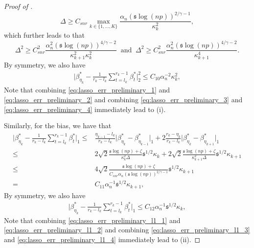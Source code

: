\documentclass[11pt]{article}
\newcommand{\s}{ { \mathfrak{s}  } }
\theoremstyle{plain}
\theoremstyle{definition}
\begin{document}
\begin{proof}[Proof of ]
$$\Delta \ge C_{snr} \max_{k \in \{1, \dots, K\}}\frac{\alpha_n(\s\log( np))^{2/\gamma -1}}{\kappa_k^2},$$
which further leads to that
$$\Delta^2 \ge C_{snr}^2\frac{\alpha_n^2(\s\log( np))^{4/\gamma -2}}{\kappa_{k+1}^2\kappa_{k}^2} \;\; \text{and} \;\; \Delta^2 \ge C_{snr}^2\frac{\alpha_n^2(\s\log( np))^{4/\gamma -2}}{\kappa_{k+1}^4}.$$
By symmetry, we also have 
\begin{align}\label{eq:lasso_err_preliminary_4}
    \bigg|\beta_{\eta_k}^* - \frac{1}{r_k-l_k}\sum_{t = l_k}^{r_k-1}\beta_t^*\bigg|_2^2 
    \leq C_{10}\alpha_n^{-2}\kappa_{k}^2,
\end{align}
Note that combining \eqref{eq:lasso_err_preliminary_1} and \eqref{eq:lasso_err_preliminary_2} and combining \eqref{eq:lasso_err_preliminary_3} and \eqref{eq:lasso_err_preliminary_4} immediately lead to (i).

Similarly, for the bias, we have that
\begin{align}\label{eq:lasso_err_preliminary_l1_2}
    \bigg|\beta_{\eta_k}^* - \frac{1}{r_k-l_k}\sum_{t = l_k}^{r_k-1}\beta_t^*\bigg|_1 
    \leq& \frac{\eta_{k-1}-l_k}{r_k-l_k}\big|\beta_{\eta_{k}}^* - \beta_{\eta_{k-1}}^*\big|_1 + 2\frac{r_k - \eta_{k}}{r_k-l_k}\big|\beta_{\eta_{k}}^* - \beta_{\eta_{k+1}}^*\big|_1 \nonumber\\
    \leq& 2\sqrt{2}\frac{\s \log(np) + \zeta}{\kappa_{k}^2\Delta}\s^{1/2}\kappa_{k} + 2\sqrt{2}\frac{\s \log(np) + \zeta}{\kappa_{k+1}^2\Delta}\s^{1/2}\kappa_{k+1} \nonumber\\
    \leq& 4\sqrt{2}\frac{\s \log(np) + \zeta}{C_{snr}\alpha_n(\s\log( np))^{2/\gamma -1}}\s^{1/2}\kappa_{k+1}\nonumber\\
    =& C_{11}\alpha_n^{-1}\s^{1/2}\kappa_{k+1},
\end{align}
By symmetry, we also have 
\begin{align}\label{eq:lasso_err_preliminary_l1_4}
    \bigg|\beta_{\eta_k}^* - \frac{1}{r_k-l_k}\sum_{t = l_k}^{r_k-1}\beta_t^*\bigg|_1 
    \leq C_{12}\alpha_n^{-1}\s^{1/2}\kappa_{k},
\end{align}
Note that combining \eqref{eq:lasso_err_preliminary_l1_1} and \eqref{eq:lasso_err_preliminary_l1_2} and combining \eqref{eq:lasso_err_preliminary_l1_3} and \eqref{eq:lasso_err_preliminary_l1_4} immediately lead to (ii).
\end{proof}
\end{document}
